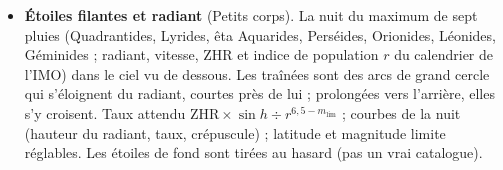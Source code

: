 \begin{itemize}
$\Delta v_1=\sqrt{GM(2/r_1-1/a)}-\sqrt{GM/r_1}$ au départ, $\Delta v_2$ à l'arrivée, durée $\pi\sqrt{a^3/GM}$ avec
$a=(r_1+r_2)/2$. Pour trouver la cible au rendez-vous, il faut partir quand elle a l'avance $\varphi=\pi-n_2t$
(angle de phase) : la fenêtre revient à chaque période synodique. Orbite basse vers la station, l'orbite
géostationnaire ou la Lune ; Terre vers Mars (2,94 puis 2,65~km\,s$^{-1}$, 259~jours, $\varphi=44{,}3^\circ$, une fenêtre
tous les 780~jours), Vénus (les deux poussées freinent) ou Jupiter. « Partir à la fenêtre de tir » ou « Partir
maintenant » ; le cercle pointillé montre où sera la cible à l'arrivée si l'on part maintenant.
\item \textbf{Étoiles filantes et radiant} (Petits corps). La nuit du maximum de sept pluies (Quadrantides, Lyrides,
êta Aquarides, Perséides, Orionides, Léonides, Géminides ; radiant, vitesse, ZHR et indice de population $r$ du
calendrier de l'IMO) dans le ciel vu de dessous. Les traînées sont des arcs de grand cercle qui s'éloignent du radiant,
courtes près de lui ; prolongées vers l'arrière, elles s'y croisent. Taux attendu $\mathrm{ZHR}\times\sin h\div
r^{6{,}5-m_\text{lim}}$ ; courbes de la nuit (hauteur du radiant, taux, crépuscule) ; latitude et magnitude limite
réglables. Les étoiles de fond sont tirées au hasard (pas un vrai catalogue).
\end{itemize}

